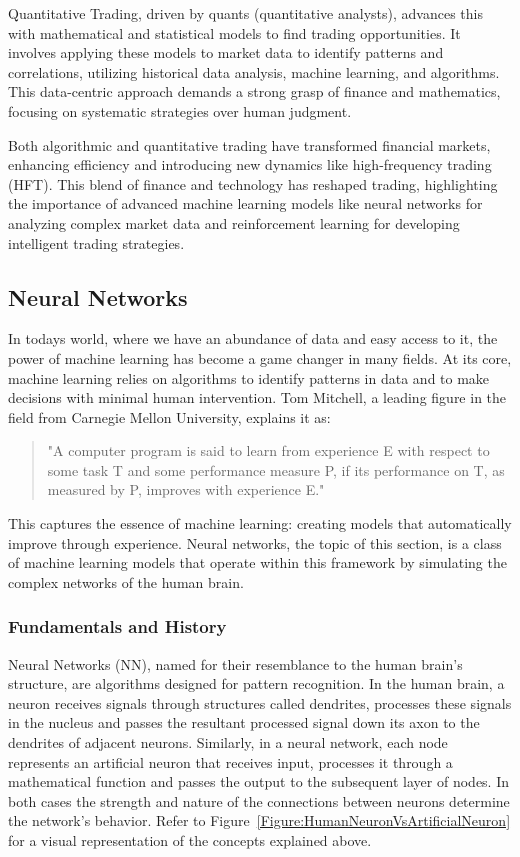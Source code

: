 Quantitative Trading, driven by quants (quantitative analysts), advances this with mathematical and statistical models to find trading opportunities. It involves applying these models to market data to identify patterns and correlations, utilizing historical data analysis, machine learning, and algorithms. This data-centric approach demands a strong grasp of finance and mathematics, focusing on systematic strategies over human judgment.

Both algorithmic and quantitative trading have transformed financial markets, enhancing efficiency and introducing new dynamics like high-frequency trading (HFT). This blend of finance and technology has reshaped trading, highlighting the importance of advanced machine learning models like neural networks for analyzing complex market data and reinforcement learning for developing intelligent trading strategies.

\subsection{Neural Networks}
In todays world, where we have an abundance of data and easy access to it, the power of machine learning has become a game changer in  many fields. At its core, machine learning relies on algorithms to identify patterns in data and to make decisions with minimal human intervention. Tom Mitchell, a leading figure in the field from Carnegie Mellon University, explains it as:
\begin{quote}
"A computer program is said to learn from experience E with respect to some task T and some performance measure P, if its performance on T, as measured by P, improves with experience E."
\end{quote}
This captures the essence of machine learning: creating models that automatically improve through experience. Neural networks, the topic of this section, is a class of machine learning models that operate within this framework by simulating the complex networks of the human brain.

\subsubsection{Fundamentals and History}
Neural Networks (NN), named for their resemblance to the human brain's structure, are algorithms designed for pattern recognition. In the human brain, a neuron receives signals through structures called dendrites, processes these signals in the nucleus and passes the resultant processed signal down its axon to the dendrites of adjacent neurons. Similarly, in a neural network, each node represents an artificial neuron that receives input, processes it through a mathematical function and passes the output to the subsequent layer of nodes. In both cases the strength and nature of the connections between neurons determine the network's behavior. Refer to Figure~\ref{Figure:HumanNeuronVsArtificialNeuron} for a visual representation of the concepts explained above.

